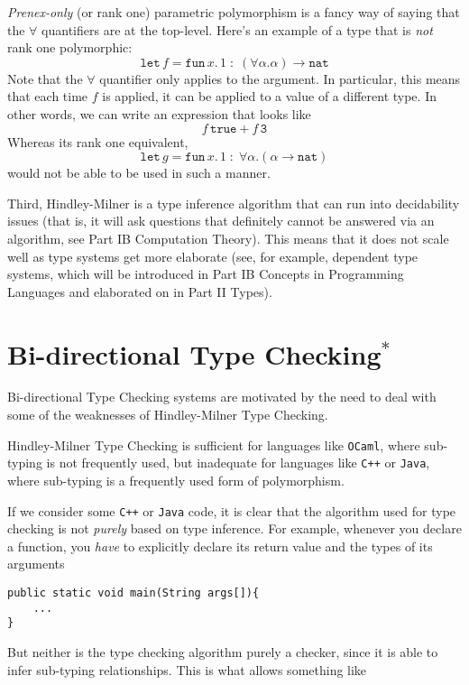 {\textit{Prenex-only} (or rank one) parametric polymorphism is a fancy way of saying that the $\forall$ quantifiers are at the top-level. Here's an example of a type that is \textit{not} rank one polymorphic:
\[\texttt{let} \,  f = \texttt{fun} \, x. \, 1 \; : \; (\forall \alpha. \alpha) \to \texttt{nat}\]
Note that the $\forall$ quantifier only applies to the argument. In particular, this means that each time $f$ is applied, it can be applied to a value of a different type. In other words, we can write an expression that looks like
\[f \, \texttt{true} + f \, \texttt{3}\]
Whereas its rank one equivalent, \[\texttt{let} \,  g = \texttt{fun} \, x. \, 1 \; : \; \forall \alpha. (\alpha \to \texttt{nat})\]
would not be able to be used in such a manner. 

Third, Hindley-Milner is a type inference algorithm that can run into decidability issues (that is, it will ask questions that definitely cannot be answered via an algorithm, see \textsf{Part IB Computation Theory}). This means that it does not scale well as type systems get more elaborate (see, for example, dependent type systems, which will be introduced in \textsf{Part IB Concepts in Programming Languages} and elaborated on in \textsf{Part II Types}).

\section{Bi-directional Type Checking$^*$}\label{section:btc}
Bi-directional Type Checking systems are motivated by the need to deal with some of the weaknesses of Hindley-Milner Type Checking. 

Hindley-Milner Type Checking is sufficient for languages like \texttt{OCaml}, where sub-typing is not frequently used, but inadequate for languages like \texttt{C++} or \texttt{Java}, where sub-typing is a frequently used form of polymorphism. 

If we consider some \texttt{C++} or \texttt{Java} code, it is clear that the algorithm used for type checking is not \textit{purely} based on type inference. For example, whenever you declare a function, you \textit{have} to explicitly declare its return value and the types of its arguments

\begin{verbatim}
public static void main(String args[]){
    ...
}
\end{verbatim}
But neither is the type checking algorithm purely a checker, since it is able to infer sub-typing relationships. This is what allows something like

}
